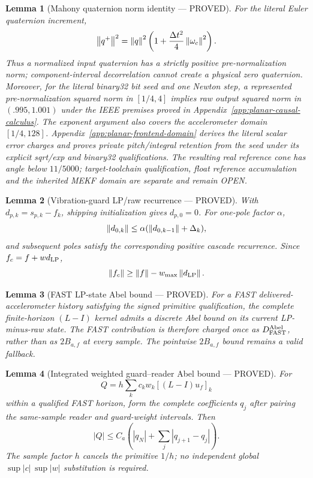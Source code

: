 \documentclass[journal]{IEEEtran}
\newtheorem{lemma}{Lemma}\newtheorem{theorem}{Theorem}\newtheorem{proposition}{Proposition}\newtheorem{remark}{Remark}\newtheorem{corollary}{Corollary}
\begin{document}
\begin{lemma}[Mahony quaternion norm identity --- PROVED]
For the literal Euler quaternion increment,
\[
\left\lVert q^+\right\rVert^2=\left\lVert q\right\rVert^2\left(1+\frac{\Delta t^2}{4}\left\lVert\omega_c\right\rVert^2\right).
\]
Thus a normalized input quaternion has a strictly positive pre-normalization norm; component-interval decorrelation cannot create a physical zero quaternion.
Moreover, for the literal binary32 bit seed and one Newton step, a represented
pre-normalization squared norm in $[1/4,4]$ implies raw output squared norm
in $(.995,1.001)$ under the IEEE premises proved in
Appendix~\ref{app:planar-causal-calculus}. The exponent argument also covers
the accelerometer domain $[1/4,128]$.
Appendix~\ref{app:planar-frontend-domain} derives the literal scalar error
charges and proves private pitch/integral retention from the seed under its
explicit sqrt/exp and binary32 qualifications. The resulting real reference
cone has angle below $11/5000$; target-toolchain qualification, float reference
accumulation and the inherited MEKF domain are separate and remain OPEN.
\end{lemma}

\begin{lemma}[Vibration-guard LP/raw recurrence --- PROVED]
With \(d_{p,k}=s_{p,k}-f_k\), shipping initialization gives \(d_{p,0}=0\).  For one-pole factor \(\alpha\),
\[
\left\lVert d_{0,k}\right\rVert\le\alpha(\left\lVert d_{0,k-1}\right\rVert+\Delta_k),
\]
and subsequent poles satisfy the corresponding positive cascade recurrence.  Since \(f_c=f+w d_{\rm LP}\),
\[
\left\lVert f_c\right\rVert\ge\left\lVert f\right\rVert-w_{\max}\left\lVert d_{\rm LP}\right\rVert.
\]
\end{lemma}

\begin{lemma}[FAST LP-state Abel bound --- PROVED]
For a FAST delivered-accelerometer history satisfying the signed primitive qualification, the complete finite-horizon \((L-I)\) kernel admits a discrete Abel bound on its current LP-minus-raw state.  The FAST contribution is therefore charged once as \(D_{\rm FAST}^{\rm Abel}\), rather than as \(2B_{a,f}\) at every sample.  The pointwise \(2B_{a,f}\) bound remains a valid fallback.
\end{lemma}

\begin{lemma}[Integrated weighted guard--reader Abel bound --- PROVED]
For
\[
Q=h\sum_k c_kw_k[(L-I)u_f]_k
\]
within a qualified FAST horizon, form the complete coefficients \(q_j\) after pairing the same-sample reader and guard-weight intervals. Then
\[
|Q|\le C_a\left(|q_N|+\sum_j|q_{j+1}-q_j|\right).
\]
The sample factor \(h\) cancels the primitive \(1/h\); no independent global \(\sup|c|\,\sup|w|\) substitution is required.
\end{lemma}
\end{document}
